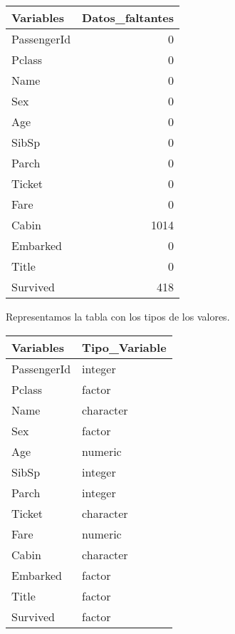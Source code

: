 \documentclass[]{article}
\newenvironment{Shaded}{\begin{snugshade}}{\end{snugshade}}
\newcommand{\KeywordTok}[1]{\textcolor[rgb]{0.13,0.29,0.53}{\textbf{#1}}}
\newcommand{\DataTypeTok}[1]{\textcolor[rgb]{0.13,0.29,0.53}{#1}}
\newcommand{\StringTok}[1]{\textcolor[rgb]{0.31,0.60,0.02}{#1}}
\newcommand{\OperatorTok}[1]{\textcolor[rgb]{0.81,0.36,0.00}{\textbf{#1}}}
\newcommand{\NormalTok}[1]{#1}
\begin{document}
\begin{tabular}{l|r}
\hline
Variables & Datos\_faltantes\\
\hline
PassengerId & 0\\
\hline
Pclass & 0\\
\hline
Name & 0\\
\hline
Sex & 0\\
\hline
Age & 0\\
\hline
SibSp & 0\\
\hline
Parch & 0\\
\hline
Ticket & 0\\
\hline
Fare & 0\\
\hline
Cabin & 1014\\
\hline
Embarked & 0\\
\hline
Title & 0\\
\hline
Survived & 418\\
\hline
\end{tabular}

Representamos la tabla con los tipos de los valores.

\begin{Shaded}
\end{Shaded}

\begin{tabular}{l|l}
\hline
Variables & Tipo\_Variable\\
\hline
PassengerId & integer\\
\hline
Pclass & factor\\
\hline
Name & character\\
\hline
Sex & factor\\
\hline
Age & numeric\\
\hline
SibSp & integer\\
\hline
Parch & integer\\
\hline
Ticket & character\\
\hline
Fare & numeric\\
\hline
Cabin & character\\
\hline
Embarked & factor\\
\hline
Title & factor\\
\hline
Survived & factor\\
\hline
\end{tabular}
\end{document}
